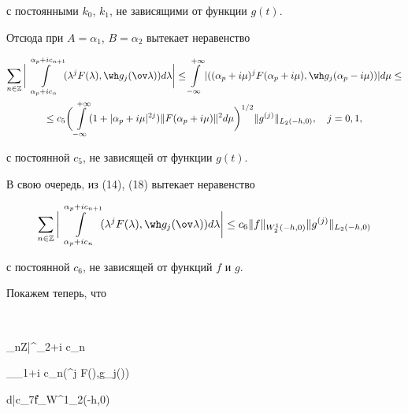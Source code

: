 с постоянными $k_0$, $k_1$, не зависящими от функции $g(t)$. 


Отсюда при $A=\alpha_1$, $B=\alpha_2$ вытекает неравенство 


\begin{multline} 


\sum_{n\in\Bbb Z}\bigg|\int\limits^{\alpha_p+i c_{n+1}} 


_{\alpha_p+i c_n}(\lambda^j F(\lambda),\wh 


g_j(\ov\lambda))d\lambda\bigg|\le 


\int\limits^{+\infty}_{-\infty}|((\alpha_p+i\mu)^j 


F(\alpha_p+i\mu),\wh g_j(\alpha_p-i\mu))|d\mu\le \\ 


% 


\le c_5\bigg(\int\limits^{+\infty}_{-\infty} 


(1+|\alpha_p+i\mu|^{2j})\|F(\alpha_p+i\mu)\|^2d\mu 


\bigg)^{1/2}\|g^{(j)}\|_{L_2(-h,0)},\quad j=0,1, 


\end{multline} 


с постоянной $c_5$, не зависящей от функции $g(t)$. 


 


В свою очередь, из (14), (18) вытекает неравенство 


\begin{equation} 


\sum_{n\in\Bbb Z}\bigg|\int\limits^{\alpha_p+i c_{n+1}} 


_{\alpha_p+i c_n}(\lambda^j F(\lambda), 


\wh g_j(\ov\lambda))d\lambda\bigg|\le c_6 


\|f\|_{W^1_2(-h,0)}\|g^{(j)}\|_{L_2(-h,0)} 


\end{equation} 


с постоянной $c_6$, не зависящей от функций $f$ и $g$. 


 


Покажем теперь, что 


$$ 


\sum_{n\in\Bbb Z}\bigg|\int\limits^{\alpha_2+i c_n} 


_{\alpha_1+i c_n}(\lambda^j F(\lambda),\wh g_j(\ov\lambda)) 


d\lambda\bigg|\le c_7\|f\|_{W^1_2(-h,0)} 


